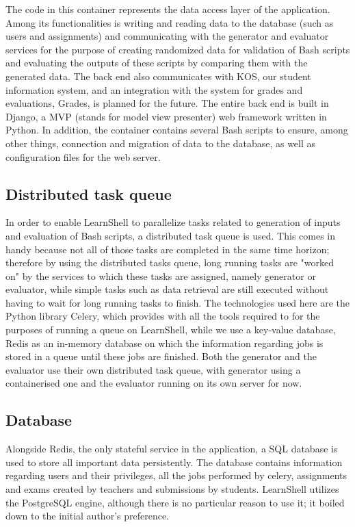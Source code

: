 \documentclass[thesis=B,english]{FITthesis}[2019/12/23]
\begin{document}
The code in this container represents the data access layer of the application. Among its functionalities is writing and reading data to the database (such as users and assignments) and communicating with the generator and evaluator services for the purpose of creating randomized data for validation of Bash scripts and evaluating the outputs of these scripts by comparing them with the generated data. \cite{learnshell-borsky} The back end also communicates with KOS, our student information system, and an integration with the system for grades and evaluations, Grades, is planned for the future.
\newline
The entire back end is built in Django, a MVP (stands for model view presenter) web framework written in Python. In addition, the container contains several Bash scripts to ensure, among other things, connection and migration of data to the database, as well as configuration files for the web server.

\subsection{Distributed task queue}

In order to enable LearnShell to parallelize tasks related to generation of inputs and evaluation of Bash scripts, a distributed task queue is used. This comes in handy because not all of those tasks are completed in the same time horizon; therefore by using the distributed tasks queue, long running tasks are "worked on" by the services to which these tasks are assigned, namely generator or evaluator, while simple tasks such as data retrieval are still executed without having to wait for long running tasks to finish.
\newline
The technologies used here are the Python library Celery, which provides with all the tools required to for the purposes of running a queue on LearnShell, while we use a key-value database, Redis as an in-memory database on which the information regarding jobs is stored in a queue until these jobs are finished. Both the generator and the evaluator use their own distributed task queue, with generator using a containerised one and the evaluator running on its own server for now.

\subsection{Database}

Alongside Redis, the only stateful service in the application, a SQL database is used to store all important data persistently. The database contains information regarding users and their privileges, all the jobs performed by celery, assignments and exams created by teachers and submissions by students. LearnShell utilizes the PostgreSQL engine, although there is no particular reason to use it; it boiled down to the initial author's preference.
\end{document}
